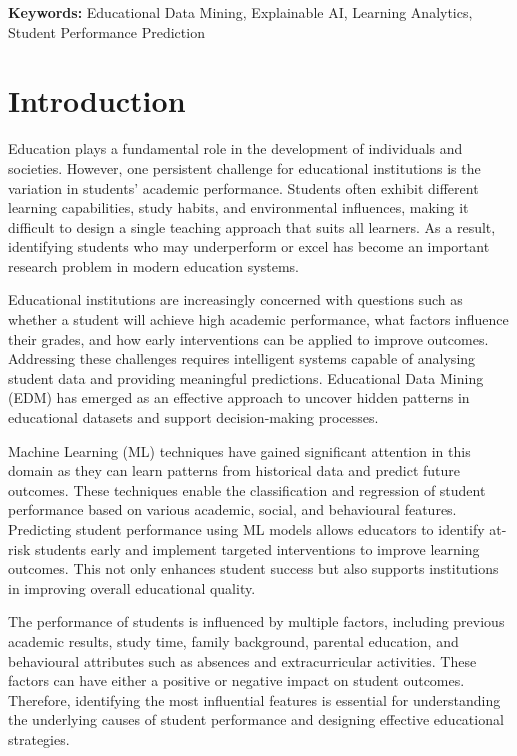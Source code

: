 \documentclass[conference]{IEEEtran}
\begin{document}
\textbf{Keywords:} Educational Data Mining, Explainable AI, Learning Analytics, Student Performance Prediction

\newpage

\section{Introduction}
Education plays a fundamental role in the development of individuals and societies. However, one persistent challenge for educational institutions is the variation in students' academic performance. Students often exhibit different learning capabilities, study habits, and environmental influences, making it difficult to design a single teaching approach that suits all learners. As a result, identifying students who may underperform or excel has become an important research problem in modern education systems. 

Educational institutions are increasingly concerned with questions such as whether a student will achieve high academic performance, what factors influence their grades, and how early interventions can be applied to improve outcomes. Addressing these challenges requires intelligent systems capable of analysing student data and providing meaningful predictions. Educational Data Mining (EDM) has emerged as an effective approach to uncover hidden patterns in educational datasets and support decision-making processes. 

Machine Learning (ML) techniques have gained significant attention in this domain as they can learn patterns from historical data and predict future outcomes. These techniques enable the classification and regression of student performance based on various academic, social, and behavioural features. Predicting student performance using ML models allows educators to identify at-risk students early and implement targeted interventions to improve learning outcomes. This not only enhances student success but also supports institutions in improving overall educational quality. 

The performance of students is influenced by multiple factors, including previous academic results, study time, family background, parental education, and behavioural attributes such as absences and extracurricular activities. These factors can have either a positive or negative impact on student outcomes. Therefore, identifying the most influential features is essential for understanding the underlying causes of student performance and designing effective educational strategies. 
\end{document}
